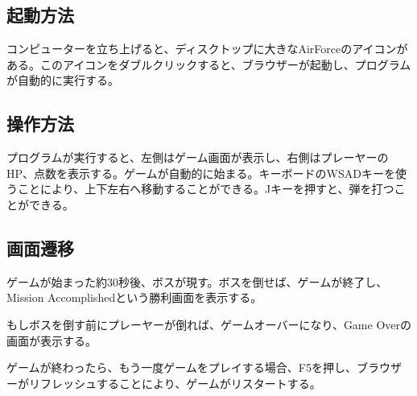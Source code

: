 \subsection{起動方法}
	コンピューターを立ち上げると、ディスクトップに大きなAirForceのアイコンがある。このアイコンをダブルクリックすると、ブラウザーが起動し、プログラムが自動的に実行する。
\subsection{操作方法}
	プログラムが実行すると、左側はゲーム画面が表示し、右側はプレーヤーのHP、点数を表示する。ゲームが自動的に始まる。キーボードのWSADキーを使うことにより、上下左右へ移動することができる。Jキーを押すと、弾を打つことができる。
\subsection{画面遷移}
	ゲームが始まった約30秒後、ボスが現す。ボスを倒せば、ゲームが終了し、Mission Accomplishedという勝利画面を表示する。
	
	もしボスを倒す前にプレーヤーが倒れば、ゲームオーバーになり、Game Overの画面が表示する。
	
	ゲームが終わったら、もう一度ゲームをプレイする場合、F5を押し、ブラウザーがリフレッシュすることにより、ゲームがリスタートする。